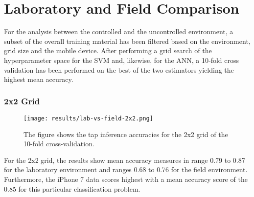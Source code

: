 
\section{Laboratory and Field Comparison}
For the analysis between the controlled and the uncontrolled environment, a subset of the overall training material has been filtered based on the environment, grid size and the mobile device. After performing a grid search of the hyperparameter space for the SVM and, likewise, for the ANN, a 10-fold cross validation has been performed on the best of the two estimators yielding the highest mean accuracy.

\subsubsection{2x2 Grid}

\begin{figure}[h!]
  \centering
  \texttt{[image: results/lab-vs-field-2x2.png]}
  \caption{The figure shows the tap inference accuracies for the 2x2 grid of the 10-fold cross-validation.} \label{fig:lab2x2}
\end{figure}

For the 2x2 grid, the results show mean accuracy measures in range 0.79 to 0.87 for the laboratory environment and ranges 0.68 to 0.76 for the field environment. Furthermore, the iPhone 7 data scores highest with a mean accuracy score of the 0.85 for this particular classification problem.

